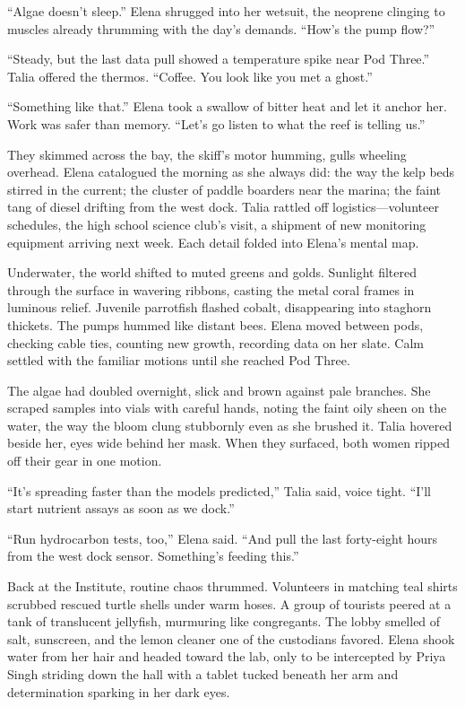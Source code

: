 “Algae doesn’t sleep.” Elena shrugged into her wetsuit, the neoprene clinging to muscles already thrumming with the day’s demands. “How’s the pump flow?”

“Steady, but the last data pull showed a temperature spike near Pod Three.” Talia offered the thermos. “Coffee. You look like you met a ghost.”

“Something like that.” Elena took a swallow of bitter heat and let it anchor her. Work was safer than memory. “Let’s go listen to what the reef is telling us.”

They skimmed across the bay, the skiff’s motor humming, gulls wheeling overhead. Elena catalogued the morning as she always did: the way the kelp beds stirred in the current; the cluster of paddle boarders near the marina; the faint tang of diesel drifting from the west dock. Talia rattled off logistics—volunteer schedules, the high school science club’s visit, a shipment of new monitoring equipment arriving next week. Each detail folded into Elena’s mental map.

Underwater, the world shifted to muted greens and golds. Sunlight filtered through the surface in wavering ribbons, casting the metal coral frames in luminous relief. Juvenile parrotfish flashed cobalt, disappearing into staghorn thickets. The pumps hummed like distant bees. Elena moved between pods, checking cable ties, counting new growth, recording data on her slate. Calm settled with the familiar motions until she reached Pod Three.

The algae had doubled overnight, slick and brown against pale branches. She scraped samples into vials with careful hands, noting the faint oily sheen on the water, the way the bloom clung stubbornly even as she brushed it. Talia hovered beside her, eyes wide behind her mask. When they surfaced, both women ripped off their gear in one motion.

“It’s spreading faster than the models predicted,” Talia said, voice tight. “I’ll start nutrient assays as soon as we dock.”

“Run hydrocarbon tests, too,” Elena said. “And pull the last forty-eight hours from the west dock sensor. Something’s feeding this.”

Back at the Institute, routine chaos thrummed. Volunteers in matching teal shirts scrubbed rescued turtle shells under warm hoses. A group of tourists peered at a tank of translucent jellyfish, murmuring like congregants. The lobby smelled of salt, sunscreen, and the lemon cleaner one of the custodians favored. Elena shook water from her hair and headed toward the lab, only to be intercepted by Priya Singh striding down the hall with a tablet tucked beneath her arm and determination sparking in her dark eyes.


